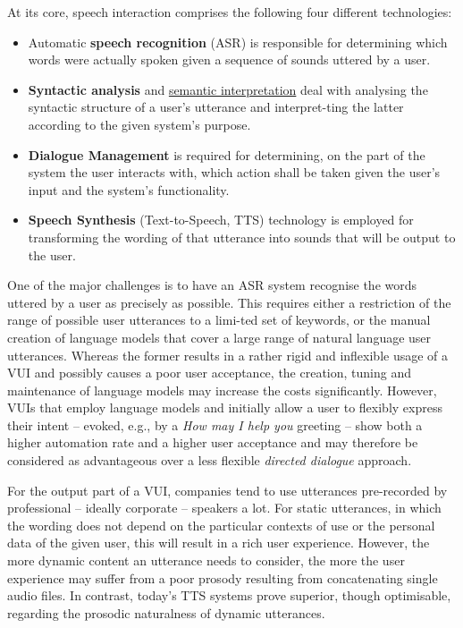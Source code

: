 \begin{multicols}{2}
At its core, speech interaction comprises the following four different technologies:
\begin{itemize}
\item Automatic \textbf{speech recognition} (ASR) is responsible for determining which words were actually spoken given a sequence of sounds uttered by a user.
\item \textbf{Syntactic analysis} and \underline{semantic interpretation} deal with analysing the syntactic structure of a user’s utterance and interpret-ting the latter according to the given system’s purpose.
\item \textbf{Dialogue Management} is required for determining, on the part of the system the user interacts with, which action shall be taken given the user’s input and the system’s functionality.
\item \textbf{Speech Synthesis} (Text-to-Speech, TTS) technology is employed for transforming the wording of that utterance into sounds that will be output to the user. 
\end{itemize}
One of the major challenges is to have an ASR system recognise the words uttered by a user as precisely as possible. This requires either a restriction of the range of possible user utterances to a limi-ted set of keywords, or the manual creation of language models that cover a large range of natural language user utterances. Whereas the former results in a rather rigid and inflexible usage of a VUI and possibly causes a poor user acceptance, the creation, tuning and maintenance of language models may increase the costs significantly. However, VUIs that employ language models and initially allow a user to flexibly express their intent – evoked, e.g., by a \textit{How may I help you} greeting – show both a higher automation rate and a higher user acceptance and may therefore be considered as advantageous over a less flexible \textit{directed dialogue} approach.


For the output part of a VUI, companies tend to use utterances pre-recorded by professional – ideally corporate – speakers a lot. For static utterances, in which the wording does not depend on the particular contexts of use or the personal data of the given user, this will result in a rich user experience. However, the more dynamic content an utterance needs to consider, the more the user experience may suffer from a poor prosody resulting from concatenating single audio files. In contrast, today’s TTS systems prove superior, though optimisable, regarding the prosodic naturalness of dynamic utterances.  


\end{multicols}
